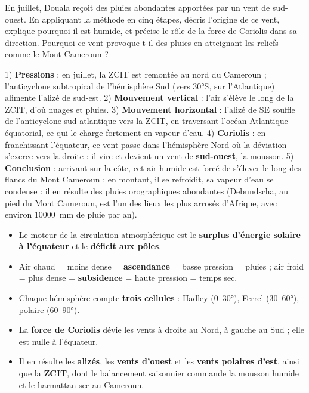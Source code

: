 \documentclass[11pt]{article}
\begin{document}
\begin{exercice}
En juillet, Douala reçoit des pluies abondantes apportées par un vent de sud-ouest. En appliquant la méthode en cinq étapes, décris l'origine de ce vent, explique pourquoi il est humide, et précise le rôle de la force de Coriolis dans sa direction. Pourquoi ce vent provoque-t-il des pluies en atteignant les reliefs comme le Mont Cameroun ?
\end{exercice}

\begin{corrige}
1) \textbf{Pressions} : en juillet, la ZCIT est remontée au nord du Cameroun ; l'anticyclone subtropical de l'hémisphère Sud (vers 30°S, sur l'Atlantique) alimente l'alizé de sud-est. 2) \textbf{Mouvement vertical} : l'air s'élève le long de la ZCIT, d'où nuages et pluies. 3) \textbf{Mouvement horizontal} : l'alizé de SE souffle de l'anticyclone sud-atlantique vers la ZCIT, en traversant l'océan Atlantique équatorial, ce qui le charge fortement en vapeur d'eau. 4) \textbf{Coriolis} : en franchissant l'équateur, ce vent passe dans l'hémisphère Nord où la déviation s'exerce vers la droite : il vire et devient un vent de \textbf{sud-ouest}, la mousson. 5) \textbf{Conclusion} : arrivant sur la côte, cet air humide est forcé de s'élever le long des flancs du Mont Cameroun ; en montant, il se refroidit, sa vapeur d'eau se condense : il en résulte des pluies orographiques abondantes (Debundscha, au pied du Mont Cameroun, est l'un des lieux les plus arrosés d'Afrique, avec environ \SI{10000}{mm} de pluie par an).
\end{corrige}

\begin{aretenir}
\begin{itemize}
\item Le moteur de la circulation atmosphérique est le \textbf{surplus d'énergie solaire à l'équateur} et le \textbf{déficit aux pôles}.
\item Air chaud = moins dense = \textbf{ascendance} = basse pression = pluies ; air froid = plus dense = \textbf{subsidence} = haute pression = temps sec.
\item Chaque hémisphère compte \textbf{trois cellules} : Hadley (0--30°), Ferrel (30--60°), polaire (60--90°).
\item La \textbf{force de Coriolis} dévie les vents à droite au Nord, à gauche au Sud ; elle est nulle à l'équateur.
\item Il en résulte les \textbf{alizés}, les \textbf{vents d'ouest} et les \textbf{vents polaires d'est}, ainsi que la \textbf{ZCIT}, dont le balancement saisonnier commande la mousson humide et le harmattan sec au Cameroun.
\end{itemize}
\end{aretenir}
\end{document}
